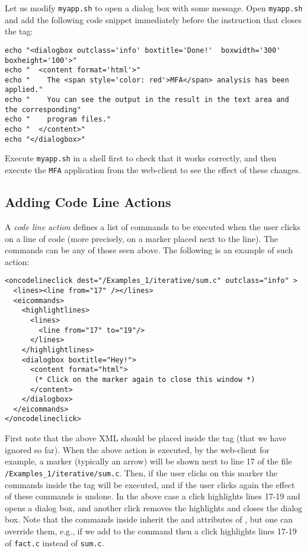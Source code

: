 Let us modify \texttt{myapp.sh} to open a dialog box with some
message. Open \texttt{myapp.sh} and add the following code snippet
immediately before the instruction that closes the 
tag:

\medskip
\begin{lstlisting}[style=script]
echo "<dialogbox outclass='info' boxtitle='Done!'  boxwidth='300' boxheight='100'>"
echo "  <content format='html'>"
echo "    The <span style='color: red'>MFA</span> analysis has been applied."
echo "    You can see the output in the result in the text area and the corresponding"
echo "    program files."
echo "  </content>"
echo "</dialogbox>"
\end{lstlisting}

\medskip
\noindent
Execute \texttt{myapp.sh} in a shell first to check that it works
correctly, and then execute the \texttt{MFA} application from the
web-client to see the effect of these changes.


\subsection{Adding Code Line Actions}

A \emph{code line action} defines a list of commands to be executed when the
user clicks on a line of code (more precisely, on a marker placed next
to the line). The commands can be any of those seen above. The
following is an example of such action:

\medskip
\begin{lstlisting}
<oncodelineclick dest="/Examples_1/iterative/sum.c" outclass="info" >
  <lines><line from="17" /></lines>
  <eicommands>
    <highlightlines>
      <lines>
        <line from="17" to="19"/>
      </lines>
    </highlightlines>
    <dialogbox boxtitle="Hey!"> 
      <content format="html">
       (* Click on the marker again to close this window *)
      </content>
    </dialogbox>
  </eicommands>
</oncodelineclick>
\end{lstlisting}

\medskip
\noindent
First note that the above XML should be placed inside the
 tag (that we have ignored so far).
%
When the above action is executed, by the web-client for example, a
marker (typically an arrow) will be shown next to line 17 of the file
\texttt{/Examples\_1/iterative/sum.c}.
%
Then, if the user clicks on this marker the commands inside the
 tag will be executed, and if the user clicks again
the effect of these commands is undone.
%
In the above case a click highlights lines 17-19 and opens a dialog
box, and another click removes the highlights and closes the dialog
box.
%
Note that the commands inside  inherit the 
and  attributes of , but one can
override them, e.g., if we add
 to the 
command then a click highlights lines 17-19 of \texttt{fact.c} instead
of \texttt{sum.c}.
%

